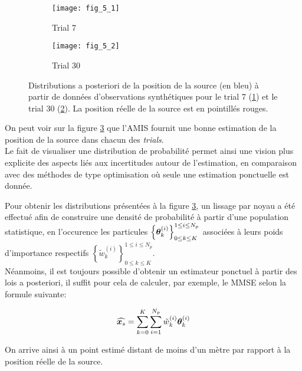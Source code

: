  \begin{figure}[h!]
 	\centering
 	\begin{subfigure}[t]{1\textwidth}
 		\centering
 		\texttt{[image: fig\_5\_1]}
 		\caption{Trial 7}
 		\label{fig_5_1_AE}
 	\end{subfigure}
 	\begin{subfigure}[t]{1\textwidth}
 		\centering
 		\texttt{[image: fig\_5\_2]}
 		\caption{Trial 30}
 		\label{fig_5_2_AE}
 	\end{subfigure}
 	\caption{Distributions a posteriori de la position de la source (en bleu) à partir de données d'observations synthétiques pour le trial 7 (\ref{fig_5_1_AE}) et le trial 30 (\ref{fig_5_2_AE}). La position réelle de la source est en pointillés rouges.}
 	\label{fig_5_AE}
 \end{figure}
 On peut voir sur la figure \ref{fig_5_AE} que l'AMIS fournit une bonne estimation de la position de la source dans chacun des \textit{trials}.\\
 
  Le fait de visualiser une distribution de probabilité permet ainsi une vision plus explicite des aspects liés aux incertitudes autour de l'estimation,  en comparaison avec des méthodes de type optimisation où seule une estimation ponctuelle est donnée.
  
  Pour obtenir les distributions présentées à la figure \ref{fig_5_AE}, {un lissage par noyau} a été effectué afin de construire une densité de probabilité à partir d'une population statistique, en l'occurence les particules $\left\{{\bm{\theta}}_k^{(i)}\right\}_{0\leq k \leq K}^{1\leq i \leq N_p}$ associées à leurs poids d'importance respectifs $\left\{\widetilde{w}_k^{(i)}\right\}_{0\leq k \leq K}^{1\leq i \leq N_p}$. \\
  
  
  Néanmoins, il est toujours possible d'obtenir un estimateur ponctuel à partir des lois a posteriori, il suffit pour cela de calculer, {par exemple}, le MMSE selon la formule suivante: 
  
  \begin{equation}
  \widehat{{\bm{x}_s}} = \sum\limits_{k=0}^K\sum\limits_{i=1}^{N_p} \tilde{w}_k^{(i)}{\bm{\theta}}_{k}^{(i)}
  \end{equation}
  
  On arrive ainsi à un point estimé distant de moins d'un mètre par rapport à la position réelle de la source. \\

